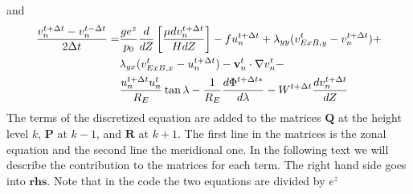 %
and
%
\begin{align}
   \frac{ v_n^{t+ \Delta t}- v_n^{t-\Delta t}}{2 \Delta t}=& \frac{g e^z}{p_0} \frac{d}{d Z}\left[
       \frac{\mu d v_n^{t+\Delta t}}{H d Z}\right] - fu_n^{t+\Delta t} +
       \lambda_{yy}(v_{ExB,y}^t- v_n^{t+\Delta t}) + \notag \\
       {} & \lambda_{yx}(v_{ExB,x}^t- u_n^{t+\Delta t}) - \mathbf{v}_n^t\cdot
       \nabla v_n^t -  \\
       {}& \frac{u_n^{t+\Delta t} u_n^t}{R_E} \tan \lambda - \frac{1}{R_E
       } \frac{d \Phi^{t+\Delta t*}}{d \lambda} - W^{t+\Delta t} \frac{d v_n^{t+\Delta t}}{d
       Z} \notag
\end{align}
%
The terms of the discretized equation are added to the matrices
$\mathbf{Q}$ at the height level $k$, $\mathbf{P}$ at $k-1$, and
$\mathbf{R}$ at $k+1$. The first line in the matrices is the zonal
equation and the second line the meridional one. In the
following text we will describe the contribution to the matrices for each
term. The right hand side goes into $\mathbf{rhs}$. Note that in the
code the two equations are divided by $e^z$ \\

